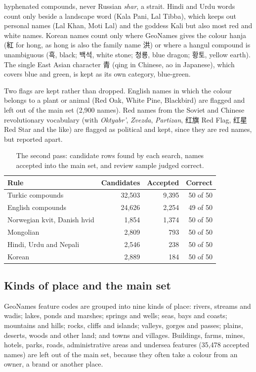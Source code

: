 \documentclass[11pt,a4paper]{article}
\begin{document}
hyphenated compounds, never Russian \textit{shar}, a strait. Hindi and Urdu words count only beside a landscape word (Kala Pani, Lal Tibba), which keeps out personal names (Lal Khan, Moti Lal) and the goddess Kali but also most red and white names. Korean names count only where GeoNames gives the colour hanja ({\cjk 紅} for hong, as hong is also the family name {\cjk 洪}) or where a hangul compound is unambiguous ({\cjk 흑}, black; {\cjk 백석}, white stone; {\cjk 청룡}, blue dragon; {\cjk 황토}, yellow earth). The single East Asian character {\cjk 青} (qing in Chinese, ao in Japanese), which covers blue and green, is kept as its own category, blue-green.

Two flags are kept rather than dropped. English names in which the colour belongs to a plant or animal (Red Oak, White Pine, Blackbird) are flagged and left out of the main set (2,900 names). Red names from the Soviet and Chinese revolutionary vocabulary (with \textit{Oktyabr'}, \textit{Zvezda}, \textit{Partizan}, {\cjk 红旗} Red Flag, {\cjk 红星} Red Star and the like) are flagged as political and kept, since they are red names, but reported apart.

\begin{table}[tbp]\centering\footnotesize\caption{The second pass: candidate rows found by each search, names accepted into the main set, and review sample judged correct.}\label{tab:supp}\begin{tabular}{lrrr}\toprule Rule & Candidates & Accepted & Correct\\\midrule
Turkic compounds & 32,503 & 9,395 & 50 of 50\\
English compounds & 24,626 & 2,254 & 49 of 50\\
Norwegian kvit, Danish hvid & 1,854 & 1,374 & 50 of 50\\
Mongolian & 2,809 & 793 & 50 of 50\\
Hindi, Urdu and Nepali & 2,546 & 238 & 50 of 50\\
Korean & 2,889 & 184 & 50 of 50\\
\bottomrule\end{tabular}\end{table}

\subsection{Kinds of place and the main set}
GeoNames feature codes are grouped into nine kinds of place: rivers, streams and wadis; lakes, ponds and marshes; springs and wells; seas, bays and coasts; mountains and hills; rocks, cliffs and islands; valleys, gorges and passes; plains, deserts, woods and other land; and towns and villages. Buildings, farms, mines, hotels, parks, roads, administrative areas and undersea features (35,478 accepted names) are left out of the main set, because they often take a colour from an owner, a brand or another place.
\end{document}
